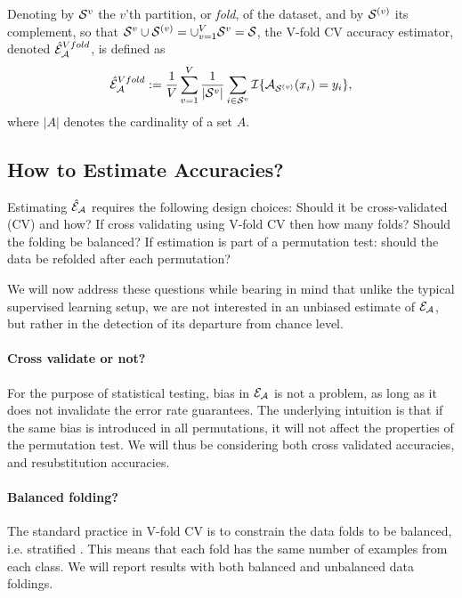 \documentclass[12pt,a4paper]{article}
\begin{document}
\begin{definition}
\label{def:v-fold}
Denoting by $\mathcal{S}^{v}$ the $v$'th partition, or \emph{fold}, of the dataset, and by $\mathcal{S}^{(v)}$ its complement, so that $\mathcal{S}^{v} \cup \mathcal{S}^{(v)}=\cup_{v=1}^V \mathcal{S}^{v}=\mathcal{S}$, the V-fold CV accuracy estimator, denoted $\hat{\mathcal{E}}_{\mathcal{A}}^{Vfold}$, is defined as 	
\begin{align}
	\hat{\mathcal{E}}_{\mathcal{A}}^{Vfold} := 
	\frac 1V \sum_{v=1}^{V} \frac{1}{|\mathcal{S}^v|} \sum_{i \in \mathcal{S}^{v}} \mathcal{I}{\{ \mathcal{A}_{\mathcal{S}^{(v)}}(x_i)=y_i \}},
\end{align}
where $|A|$ denotes the cardinality of a set $A$.
\end{definition}




\subsection{How to Estimate Accuracies?}
\label{sec:considerations}

Estimating $\hat{\mathcal{E}}_{\mathcal{A}}$ requires the following design choices: 
Should it be cross-validated (CV) and how? 
If cross validating using V-fold CV then how many folds? 
Should the folding be balanced?
If estimation is part of a permutation test: should the data be refolded after each permutation? 

We will now address these questions while bearing in mind that unlike the typical supervised learning setup, we are not interested in an unbiased estimate of $\mathcal{E}_{\mathcal{A}}$, but rather in the detection of its departure from chance level. 

\paragraph{Cross validate or not?}
For the purpose of statistical testing, bias in $\mathcal{E}_{\mathcal{A}}$ is not a problem, as long as it does not invalidate the error rate guarantees. 
The underlying intuition is that if the same bias is introduced in all permutations, it will not affect the properties of the permutation test. 
We will thus be considering both cross validated accuracies, and resubstitution accuracies.


\paragraph{Balanced folding?}
The standard practice in V-fold CV is to constrain the data folds to be balanced, i.e. stratified \citep[e.g.][]{ojala_permutation_2010}.
This means that each fold has the same number of examples from each class. 
We will report results with both balanced and unbalanced data foldings. 
\end{document}
